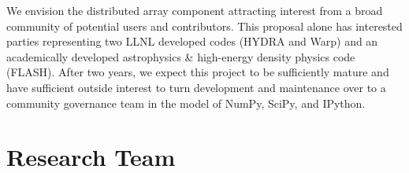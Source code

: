 \documentclass[letterpaper,11pt]{article}
\begin{document}
We envision the distributed array component attracting interest from a broad community 
of potential users and contributors.  This proposal alone has interested parties 
representing two LLNL developed codes (HYDRA and Warp) and an academically developed 
astrophysics \& high-energy density physics code (FLASH).  After two years, we expect this 
project to be sufficiently mature and have sufficient outside interest to turn development 
and maintenance over to a community governance team in the model of NumPy, SciPy, and IPython.


\section*{Research Team}
\end{document}
